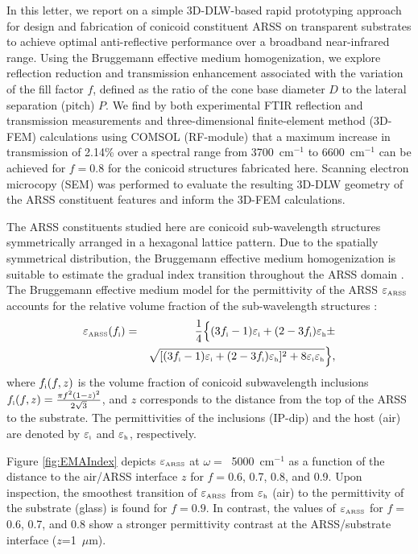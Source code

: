\documentclass[9pt,twocolumn,twoside]{osajnl}
\newcommand{\sss}{\scriptscriptstyle}
\newcommand{\sst}{\scriptstyle}
\newcommand{\stext}[1]{\sss \text{#1} \sst}
\begin{document}
In this letter, we report on a simple 3D-DLW-based rapid prototyping approach for design and fabrication of conicoid constituent ARSS on transparent substrates to achieve optimal anti-reflective performance over a broadband near-infrared range. Using the Bruggemann effective medium homogenization, we explore reflection reduction and transmission enhancement associated with the variation of the fill factor $f$, defined as the ratio of the cone base diameter $D$ to the lateral separation (pitch) $P$. We find by both experimental FTIR reflection and transmission measurements and three-dimensional finite-element method (3D-FEM) calculations using COMSOL (RF-module) that a maximum increase in transmission of 2.14\% over a spectral range from 3700~cm$^{-1}$ to 6600~cm$^{-1}$ can be achieved for $f=0.8$ for the conicoid structures fabricated here. Scanning electron microcopy (SEM) was performed to evaluate the resulting 3D-DLW geometry of the ARSS constituent features and inform the 3D-FEM calculations.
 

The ARSS constituents studied here are conicoid sub-wavelength structures symmetrically arranged in a hexagonal lattice pattern. Due to the spatially symmetrical distribution, the Bruggemann effective medium homogenization is suitable to estimate the gradual index transition throughout the ARSS domain \cite{lucarini2005}. The Bruggemann effective medium model for the permittivity of the ARSS $\varepsilon_{\stext{ARSS}}$ accounts for the relative volume fraction of the sub-wavelength structures \cite{Shalaev2009}:
\begin{eqnarray}
\varepsilon_{\stext{ARSS}}(f_{\stext{i}})&=&\frac{1}{4}\Big\{(3f_{\stext{i}}-1)\varepsilon_{\stext{i}}+(2-3f_{\stext{i}})\varepsilon_{\stext{h}}\pm \\\nonumber
&&\sqrt{[(3f_{\stext{i}}-1)\varepsilon_{\stext{i}}+(2-3f_{\stext{i}})\varepsilon_{\stext{h}}]^2+8\varepsilon_{\stext{i}}\varepsilon_{\stext{h}}}\Big\},
\end{eqnarray}
\noindent where $f_{\stext{i}}(f,z)$ is the volume fraction of conicoid subwavelength inclusions $f_{\stext{i}}(f,z)=\frac{\pi f^2(1-z)^2}{2\sqrt{3}}$, and $z$ corresponds to the distance from the top of the ARSS to the substrate. The permittivities of the inclusions (IP-dip) and the host (air) are denoted by $\varepsilon_{\stext{i}}$ and $\varepsilon_{\stext{h}}$, respectively. 

Figure \ref{fig:EMAIndex} depicts $\varepsilon_{\stext{ARSS}}$ at $\omega=\ $ 5000~cm$^{-1}$ as a function of the distance to the air/ARSS interface $z$ for $f=$0.6, 0.7, 0.8, and 0.9. Upon inspection, the smoothest transition of $\varepsilon_{\stext{ARSS}}$ from $\varepsilon_{\stext{h}}$ (air) to the permittivity of the substrate (glass) is found for $f=0.9$. In contrast, the values of $\varepsilon_{\stext{ARSS}}$ for $f=$ 0.6, 0.7, and 0.8 show a stronger permittivity contrast at the ARSS/substrate interface ($z$=1~$\mu$m). 
 
\end{document}
